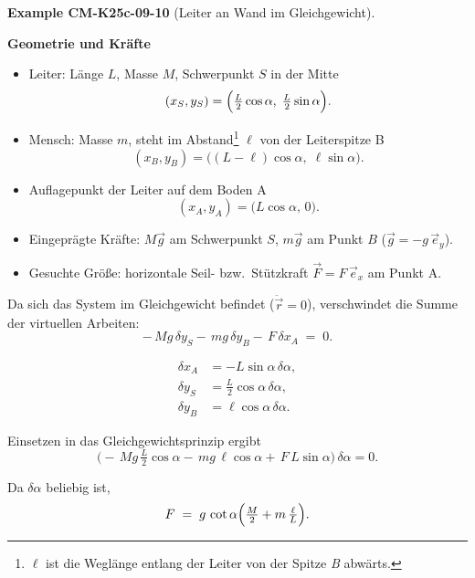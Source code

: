 \documentclass[10pt, letterpaper]{article}
\newcommand{\CustomHeading}[3]{%
  \par\medskip\noindent%
  \textbf{#1 #2} \textnormal{(#3)}.\enskip%
}
\newenvironment{EXA}[2]{\CustomHeading{Example}{#1}{#2}}{}
\begin{document}
\begin{EXA}{CM-K25c-09-10}{Leiter an Wand im Gleichgewicht}
\textbf{Geometrie und Kräfte}

\begin{itemize}
\item Leiter: Länge $L$, Masse $M$, Schwerpunkt $S$ in der Mitte
      \[
        (x_S,y_S)=\Bigl(\tfrac{L}{2}\cos\alpha,\;\tfrac{L}{2}\sin\alpha\Bigr).
      \]
\item Mensch: Masse $m$, steht im Abstand\footnote{%
      $\ell$ ist die Weglänge entlang der Leiter von der Spitze
      \emph{B} abwärts.}  
      $\ell$ von der Leiter­spitze B
      \[
        (x_B,y_B)=\bigl((L-\ell)\cos\alpha,\;\ell\sin\alpha\bigr).
      \]
\item Auflagepunkt der Leiter auf dem Boden A
      \[
        (x_A,y_A)=\bigl(L\cos\alpha,\,0\bigr).
      \]
\item Eingeprägte Kräfte: 
      $M\vec g$ am Schwerpunkt $S$,  
      $m\vec g$ am Punkt $B$  
      ($\vec g=-g\,\vec e_y$).
\item Gesuchte Größe: horizontale Seil- bzw.\ Stütz­kraft
      $\vec F = F\,\vec e_x$ am Punkt A.
\end{itemize}

Da sich das System im Gleichgewicht befindet ($\ddot{\vec r}=0$),
verschwindet die Summe der virtuellen Arbeiten:
\[
  -\,Mg\,\delta y_S
  -\,mg\,\delta y_B
  -\,F\,\delta x_A
  \;=\;0 .
\]

\[
\begin{aligned}
  \delta x_A &= -L\sin\alpha\,\delta\alpha,\\
  \delta y_S &= \tfrac{L}{2}\cos\alpha\,\delta\alpha,\\
  \delta y_B &= \ell\cos\alpha\,\delta\alpha.
\end{aligned}
\]

Einsetzen in das Gleichgewichtsprinzip ergibt
\[
  \bigl(
    -\,Mg\,\tfrac{L}{2}\cos\alpha
    -\,mg\,\ell\cos\alpha
    +\,F\,L\sin\alpha
  \bigr)\,\delta\alpha = 0.
\]

Da $\delta\alpha$ beliebig ist,
\[
  F
  \;=\;
  g\,\cot\alpha
  \Bigl(\tfrac{M}{2} + m\,\tfrac{\ell}{L}\Bigr).
\]


\end{EXA}
\end{document}
